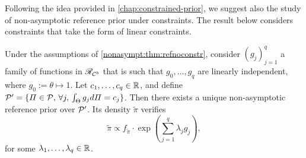 Following the idea provided in \cref{chap:constrained-prior}, we suggest also the study of non-asymptotic reference prior under constraints. The result below considers constraints that take the form of linear constraints. 


\begin{thm}\label{nonasympt:thm:constr}
    Under the assumptions of \cref{nonasympt:thm:refnoconstr}, consider $(g_j)_{j=1}^q$ a family of functions in $\mathscr{R}_{\mathcal{C}^b}$ that is such that $g_0,\dots,g_q$ are linearly independent, where $g_0:=\theta\mapsto 1$. Let $c_1,\dots,c_q\in\mathbb{R}$, and define $\mathcal{P}'=\{\varPi\in\mathcal{P},\,\forall j,\, \int_\Theta g_jd\varPi=c_j\}$. Then there exists a unique non-asymptotic reference prior over $\mathcal{P}'$. Its density $\tilde\pi$ verifies 
        \begin{equation}
            \tilde\pi\propto f_{\tilde\pi}\cdot\exp\left(\sum_{j=1}^q\lambda_jg_j\right),
        \end{equation}
    for some $\lambda_1,\dots,\lambda_q\in\mathbb{R}$.
\end{thm}



